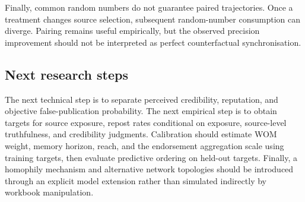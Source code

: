 Finally, common random numbers do not guarantee paired trajectories. Once a treatment changes source selection, subsequent random-number consumption can diverge. Pairing remains useful empirically, but the observed precision improvement should not be interpreted as perfect counterfactual synchronisation.

\subsection{Next research steps}

The next technical step is to separate perceived credibility, reputation, and objective false-publication probability. The next empirical step is to obtain targets for source exposure, repost rates conditional on exposure, source-level truthfulness, and credibility judgments. Calibration should estimate WOM weight, memory horizon, reach, and the endorsement aggregation scale using training targets, then evaluate predictive ordering on held-out targets. Finally, a homophily mechanism and alternative network topologies should be introduced through an explicit model extension rather than simulated indirectly by workbook manipulation.
